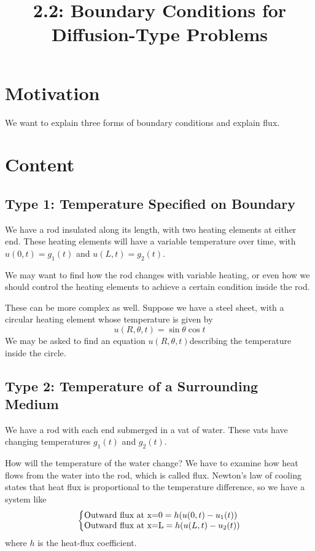 \documentclass{article}
\title{2.2: Boundary Conditions for Diffusion-Type Problems}
\begin{document}
\maketitle
\section{Motivation}

We want to explain three forms of boundary conditions and explain flux.

\section{Content}

\subsection{Type 1: Temperature Specified on Boundary}

We have a rod insulated along its length, with two heating elements at either end. These heating elements will have a variable temperature over time, with $u(0,t) = g_1(t)$ and $u(L,t) = g_2(t)$.

We may want to find how the rod changes with variable heating, or even how we should control the heating elements to achieve a certain condition inside the rod. 

These can be more complex as well. Suppose we have a steel sheet, with a circular heating element whose temperature is given by $$u(R,\theta, t) = \sin\theta \cos t$$We may be asked to find an equation $u(R,\theta,t)$describing the temperature inside the circle. 

\subsection{Type 2: Temperature of a Surrounding Medium}

We have a rod with each end submerged in a vat of water. These vats have changing temperatures $g_1(t)$ and $g_2(t)$. 

How will the temperature of the water change? We have to examine how heat flows from the water into the rod, which is called flux. Newton's law of cooling states that heat flux is proportional to the temperature difference, so we have a system like $$\left\{\begin{array}{@{}l@{}} \text{Outward flux at x=0} = h(u(0,t) - u_1(t)) \\ \text{Outward flux at x=L} = h(u(L,t) - u_2(t))\end{array}\right.$$where $h$ is the heat-flux coefficient.
\end{document}
